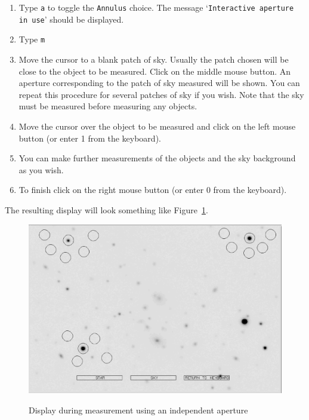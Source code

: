 \documentclass[twoside,11pt]{article}
\begin{document}
\begin{enumerate}
  \begin{enumerate}

    \item Type {\tt a} to toggle the {\tt Annulus} choice.  The message
     `{\tt Interactive aperture in use}' should be displayed.

    \item Type {\tt m}

    \item Move the cursor to a blank patch of sky.  Usually the patch
     chosen will be close to the object to be measured.  Click on the
     middle mouse button.  An aperture corresponding to the patch of
     sky measured will be shown.  You can repeat this procedure for
     several patches of sky if you wish.  Note that the sky must be
     measured before measuring any objects.

    \item Move the cursor over the object to be measured and click
     on the left mouse button (or enter 1 from the keyboard).

    \item You can make further measurements of the objects and the sky
     background as you wish.

    \item To finish click on the right mouse button (or enter 0 from
     the keyboard).

  \end{enumerate}

   The resulting display will look something like Figure~\ref{an2}.

  \begin{figure}[htbp]
     \centering 
     \includegraphics[totalheight=3in]{sc6_ap2.ps}
     \begin{quote}
     \caption{Display during measurement using an independent aperture
     \label{an2} }
     \end{quote}
  \end{figure}


\end{enumerate}
\end{document}
